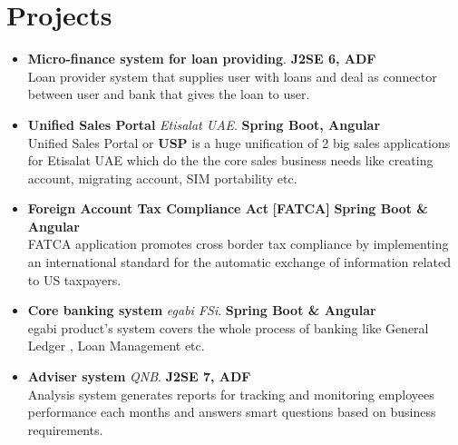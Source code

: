 \documentclass[]{friggeri-cv}
\begin{document}
\section{Projects}
\begin{itemize}
    \item \textbf{Micro-finance system for loan providing}.  \hfill \textbf{J2SE 6, ADF} \\
    Loan provider system that supplies user with loans and deal as connector between user and bank that gives the loan to user.

    \item \textbf{ Unified Sales Portal} \textit{Etisalat UAE}. \hfill \textbf{Spring Boot, Angular} \\
   Unified Sales Portal or \textbf{USP} is a huge unification of 2 big sales applications for Etisalat UAE which do the the core sales business needs like creating account, migrating account, SIM portability etc.

	\item \textbf{Foreign Account Tax Compliance Act} \textbf{[FATCA]} \hfill \textbf{Spring Boot \& Angular} \\
	 FATCA application promotes cross border tax compliance by implementing an international standard for the automatic exchange of information related to US taxpayers. 
        
    
    \item \textbf{Core banking system} \textit{egabi FSi}. \hfill \textbf{Spring Boot \& Angular} \\
    egabi product's system covers the whole process of banking like General Ledger , Loan Management etc.

    \item \textbf{Adviser system} \textit{QNB}. \hfill \textbf{J2SE 7, ADF} \\
    Analysis system generates reports for tracking and monitoring employees performance each months and  answers smart questions based on business requirements.
    
\end{itemize}
\end{document}
